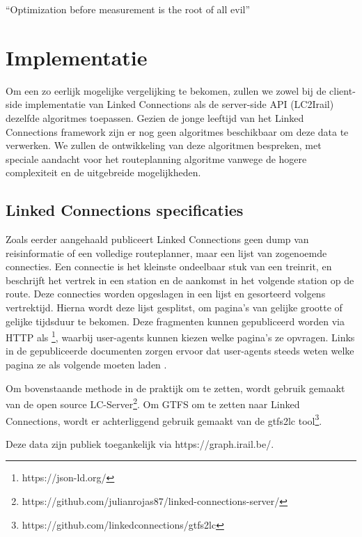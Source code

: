 \begin{savequote}[0.55\linewidth]
	``Optimization before measurement is the root of all evil''
\end{savequote}

\chapter{Implementatie}
\label{chap:implementatie}

Om een zo eerlijk mogelijke vergelijking te bekomen, zullen we zowel bij de client-side implementatie van Linked Connections als de server-side API (LC2Irail) dezelfde algoritmes toepassen. Gezien de jonge leeftijd van het Linked Connections framework zijn er nog geen algoritmes beschikbaar om deze data te verwerken. We zullen de ontwikkeling van deze algoritmen bespreken, met speciale aandacht voor het routeplanning algoritme vanwege de hogere complexiteit en de uitgebreide mogelijkheden.

\section{Linked Connections specificaties}
\label{sec:lcformaat}
Zoals eerder aangehaald publiceert Linked Connections geen dump van reisinformatie of een volledige routeplanner, maar een lijst van zogenoemde connecties. Een connectie is het kleinste ondeelbaar stuk van een treinrit, en beschrijft het vertrek in een station en de aankomst in het volgende station op de route. Deze connecties worden opgeslagen in een lijst en gesorteerd volgens vertrektijd. Hierna wordt deze lijst gesplitst, om pagina's van gelijke grootte of gelijke tijdsduur te bekomen. Deze fragmenten kunnen gepubliceerd worden via HTTP als \footnote{https://json-ld.org/}, waarbij user-agents kunnen kiezen welke pagina's ze opvragen. Links in de gepubliceerde documenten zorgen ervoor dat user-agents steeds weten welke pagina ze als volgende moeten laden \citep{linkedconnections18}.

Om bovenstaande methode in de praktijk om te zetten, wordt gebruik gemaakt van de open source LC-Server\footnote{https://github.com/julianrojas87/linked-connections-server/}. Om GTFS om te zetten naar Linked Connections, wordt er achterliggend gebruik gemaakt van de gtfs2lc tool\footnote{https://github.com/linkedconnections/gtfs2lc}.

Deze data zijn publiek toegankelijk via https://graph.irail.be/.

